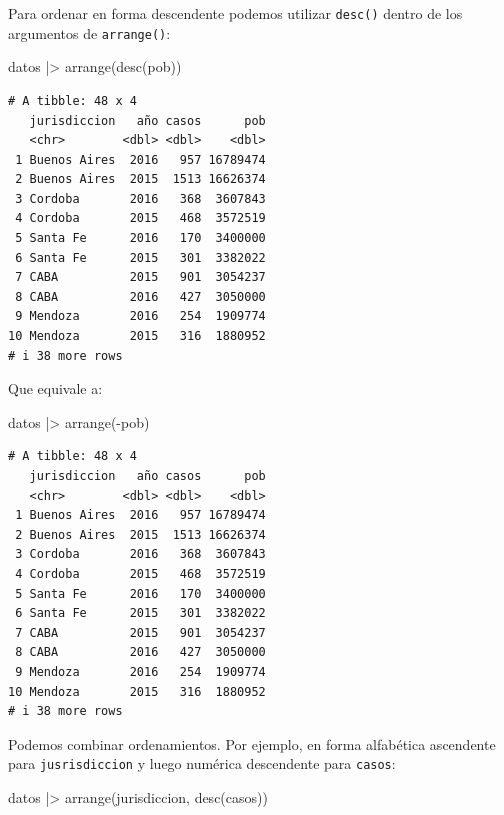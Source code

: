 \documentclass[
  spanish,
  a4paper,
]{scrbook}
\newenvironment{Shaded}{\begin{snugshade}}{\end{snugshade}}
\newcommand{\FunctionTok}[1]{\textcolor[rgb]{0.28,0.35,0.67}{#1}}
\newcommand{\NormalTok}[1]{\textcolor[rgb]{0.00,0.23,0.31}{#1}}
\newcommand{\SpecialCharTok}[1]{\textcolor[rgb]{0.37,0.37,0.37}{#1}}
\begin{document}
Para ordenar en forma descendente podemos utilizar \texttt{desc()}
dentro de los argumentos de \texttt{arrange()}:

\begin{Shaded}
\begin{Highlighting}[]
\NormalTok{datos }\SpecialCharTok{|\textgreater{}}
  \FunctionTok{arrange}\NormalTok{(}\FunctionTok{desc}\NormalTok{(pob))}
\end{Highlighting}
\end{Shaded}

\begin{verbatim}
# A tibble: 48 x 4
   jurisdiccion   año casos      pob
   <chr>        <dbl> <dbl>    <dbl>
 1 Buenos Aires  2016   957 16789474
 2 Buenos Aires  2015  1513 16626374
 3 Cordoba       2016   368  3607843
 4 Cordoba       2015   468  3572519
 5 Santa Fe      2016   170  3400000
 6 Santa Fe      2015   301  3382022
 7 CABA          2015   901  3054237
 8 CABA          2016   427  3050000
 9 Mendoza       2016   254  1909774
10 Mendoza       2015   316  1880952
# i 38 more rows
\end{verbatim}

Que equivale a:

\begin{Shaded}
\begin{Highlighting}[]
\NormalTok{datos }\SpecialCharTok{|\textgreater{}}
  \FunctionTok{arrange}\NormalTok{(}\SpecialCharTok{{-}}\NormalTok{pob)}
\end{Highlighting}
\end{Shaded}

\begin{verbatim}
# A tibble: 48 x 4
   jurisdiccion   año casos      pob
   <chr>        <dbl> <dbl>    <dbl>
 1 Buenos Aires  2016   957 16789474
 2 Buenos Aires  2015  1513 16626374
 3 Cordoba       2016   368  3607843
 4 Cordoba       2015   468  3572519
 5 Santa Fe      2016   170  3400000
 6 Santa Fe      2015   301  3382022
 7 CABA          2015   901  3054237
 8 CABA          2016   427  3050000
 9 Mendoza       2016   254  1909774
10 Mendoza       2015   316  1880952
# i 38 more rows
\end{verbatim}

Podemos combinar ordenamientos. Por ejemplo, en forma alfabética
ascendente para \texttt{jusrisdiccion} y luego numérica descendente para
\texttt{casos}:

\begin{Shaded}
\begin{Highlighting}[]
\NormalTok{datos }\SpecialCharTok{|\textgreater{}}
  \FunctionTok{arrange}\NormalTok{(jurisdiccion, }\FunctionTok{desc}\NormalTok{(casos))}
\end{Highlighting}
\end{Shaded}
\end{document}
